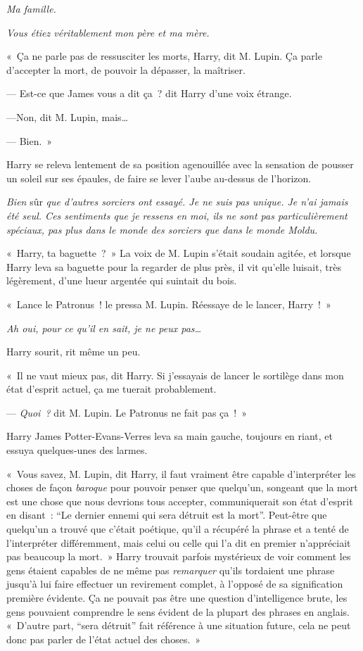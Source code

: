 \emph{Ma famille.}

\emph{Vous étiez véritablement mon père et ma mère.}

«~Ça ne parle pas de ressusciter les morts, Harry, dit M. Lupin.
Ça parle d'accepter la mort, de pouvoir la dépasser, la maîtriser.

--- Est-ce que James vous a dit ça~? dit Harry d'une voix étrange.

---Non, dit M. Lupin, mais…

--- Bien.~»

Harry se releva lentement de sa position agenouillée avec la sensation de pousser un soleil sur ses épaules, de faire se lever l'aube au-dessus de l'horizon.

\emph{Bien} sûr \emph{que d'autres sorciers ont essayé.
Je ne suis pas unique.
Je n'ai jamais été seul.
Ces sentiments que je ressens en moi, ils ne sont pas particulièrement spéciaux, pas plus dans le monde des sorciers que dans le monde Moldu.}

«~Harry, ta baguette~?~»
La voix de M. Lupin s'était soudain agitée, et lorsque Harry leva sa baguette pour la regarder de plus près, il vit qu'elle luisait, très légèrement, d'une lueur argentée qui suintait du bois.

«~Lance le Patronus~! le pressa M. Lupin.
Réessaye de le lancer, Harry~!~»

\emph{Ah oui, pour ce qu'il en sait, je ne peux pas…}

Harry sourit, rit même un peu.

«~Il ne vaut mieux pas, dit Harry.
Si j'essayais de lancer le sortilège dans mon état d'esprit actuel, ça me tuerait probablement.

--- \emph{Quoi~?} dit M. Lupin.
Le Patronus ne fait pas ça~!~»

Harry James Potter-Evans-Verres leva sa main gauche, toujours en riant, et essuya quelques-unes des larmes.

«~Vous savez, M. Lupin, dit Harry, il faut vraiment être capable d'interpréter les choses de façon \emph{baroque} pour pouvoir penser que quelqu'un, songeant que la mort est une chose que nous devrions tous accepter, communiquerait son état d'esprit en disant~: “Le dernier ennemi qui sera détruit est la mort”.
Peut-être que quelqu'un a trouvé que c'était poétique, qu'il a récupéré la phrase et a tenté de l'interpréter différemment, mais celui ou celle qui l'a dit en premier n'appréciait pas beaucoup la mort.~»
Harry trouvait parfois mystérieux de voir comment les gens étaient capables de ne même pas \emph{remarquer} qu'ils tordaient une phrase jusqu'à lui faire effectuer un revirement complet, à l'opposé de sa signification première évidente.
Ça ne pouvait pas être une question d'intelligence brute, les gens pouvaient comprendre le sens évident de la plupart des phrases en anglais.
«~D'autre part, “sera détruit” fait référence à une situation future, cela ne peut donc pas parler de l'état actuel des choses.~»

